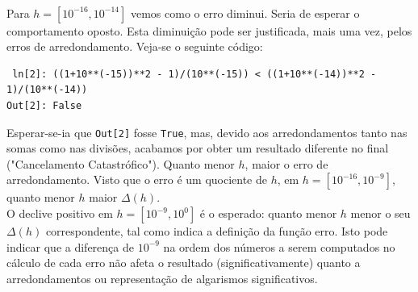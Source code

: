 \documentclass[aps,pre,twocolumn,showpacs,amsmath,amssymb]{revtex4-1}
\begin{document}
\\
Para $h=[10^{-16},10^{-14}]$ vemos como o erro diminui. Seria de esperar o comportamento oposto. Esta diminuição pode ser justificada, mais uma vez, pelos erros de arredondamento. Veja-se o seguinte código:
\begin{lstlisting}
 ln[2]: ((1+10**(-15))**2 - 1)/(10**(-15)) < ((1+10**(-14))**2 - 1)/(10**(-14))
Out[2]: False
\end{lstlisting}
Esperar-se-ia que \texttt{Out[2]} fosse \texttt{True}, mas, devido aos arredondamentos tanto nas somas como nas divisões, acabamos por obter um resultado diferente no final ("Cancelamento Catastrófico"). Quanto menor $h$, maior o erro de arredondamento. Visto que o erro é um quociente de $h$, em $h=[10^{-16},10^{-9}]$, quanto menor $h$ maior $\Delta(h)$.\\
O declive positivo em $h=[10^{-9},10^{0}]$ é o esperado: quanto menor $h$ menor o seu $\Delta(h)$ correspondente, tal como indica a definição da função erro. Isto pode indicar que a diferença de $10^{-9}$ na ordem dos números a serem computados no cálculo de cada erro não afeta o resultado (significativamente) quanto a arredondamentos ou representação de algarismos significativos.
\end{document}
